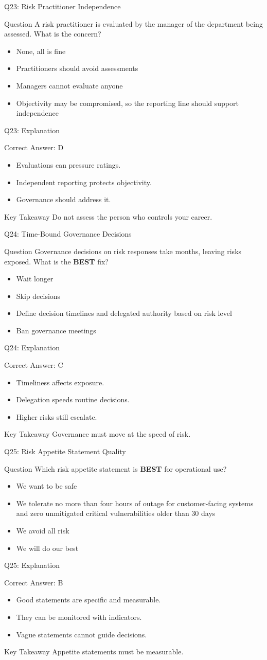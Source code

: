 \documentclass[aspectratio=169]{beamer}
\newcommand{\hq}[7]{%
	\begin{frame}{Q#1: #2}
		\begin{block}{Question}
			#3
		\end{block}
		\begin{itemize}
			#4
		\end{itemize}
	\end{frame}
	\begin{frame}{Q#1: Explanation}
		\begin{block}{Correct Answer: #5}
			\begin{itemize}
				#6
			\end{itemize}
		\end{block}
		\begin{alertblock}{Key Takeaway}
			#7
		\end{alertblock}
	\end{frame}
}
\begin{document}
	\hq{23}{Risk Practitioner Independence}
	{A risk practitioner is evaluated by the manager of the department being assessed. What is the concern?}
	{\item[\textbf{(A)}] None, all is fine
		\item[\textbf{(B)}] Practitioners should avoid assessments
		\item[\textbf{(C)}] Managers cannot evaluate anyone
		\item[\textbf{(D)}] Objectivity may be compromised, so the reporting line should support independence}
	{D}
	{\item Evaluations can pressure ratings.
		\item Independent reporting protects objectivity.
		\item Governance should address it.}
	{Do not assess the person who controls your career.}

	\hq{24}{Time-Bound Governance Decisions}
	{Governance decisions on risk responses take months, leaving risks exposed. What is the \textbf{BEST} fix?}
	{\item[\textbf{(A)}] Wait longer
		\item[\textbf{(B)}] Skip decisions
		\item[\textbf{(C)}] Define decision timelines and delegated authority based on risk level
		\item[\textbf{(D)}] Ban governance meetings}
	{C}
	{\item Timeliness affects exposure.
		\item Delegation speeds routine decisions.
		\item Higher risks still escalate.}
	{Governance must move at the speed of risk.}

	\hq{25}{Risk Appetite Statement Quality}
	{Which risk appetite statement is \textbf{BEST} for operational use?}
	{\item[\textbf{(A)}] We want to be safe
		\item[\textbf{(B)}] We tolerate no more than four hours of outage for customer-facing systems and zero unmitigated critical vulnerabilities older than 30 days
		\item[\textbf{(C)}] We avoid all risk
		\item[\textbf{(D)}] We will do our best}
	{B}
	{\item Good statements are specific and measurable.
		\item They can be monitored with indicators.
		\item Vague statements cannot guide decisions.}
	{Appetite statements must be measurable.}
\end{document}
